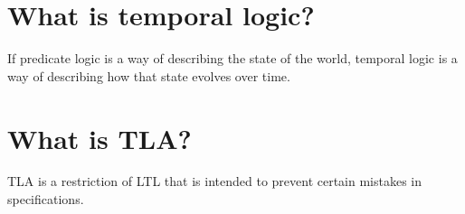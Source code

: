 \documentclass{scrbook}
\begin{document}
\chapter{What is temporal logic?}

If predicate logic is a way of describing the state of the world, temporal logic
is a way of describing how that state evolves over time.

\chapter{What is TLA?}

TLA is a restriction of LTL that is intended to prevent certain mistakes in
specifications.
\end{document}

